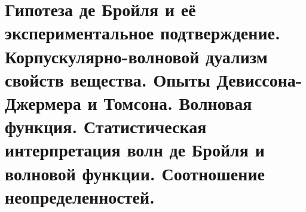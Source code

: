 \chapter{Гипотеза де Бройля и её экспериментальное подтверждение. 
Корпускулярно-волновой дуализм свойств вещества. Опыты Девиссона-
Джермера и Томсона. Волновая функция. Статистическая интерпретация 
волн де Бройля и волновой функции. Соотношение неопределенностей.}

\newpage
